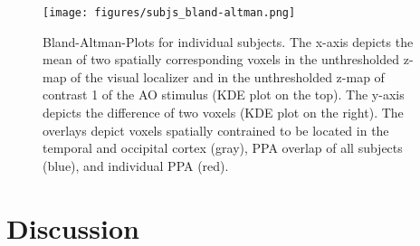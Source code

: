 \documentclass[english]{article}
\begin{document}



\begin{figure} \centering
    \texttt{[image: figures/subjs\_bland-altman.png]}
    \caption{Bland-Altman-Plots for individual subjects. The x-axis depicts the
        mean of two spatially corresponding voxels in the unthresholded z-map of
        the visual localizer and in the unthresholded z-map of contrast 1 of the
        AO stimulus (KDE plot on the top). The y-axis depicts the difference of
        two voxels (KDE plot on the right). The overlays depict voxels spatially
        contrained to be located in the temporal and occipital cortex (gray),
    PPA overlap of all subjects (blue), and individual PPA (red).}
    \label{fig:bland-altman} \end{figure}


\section{Discussion}






\end{document}
